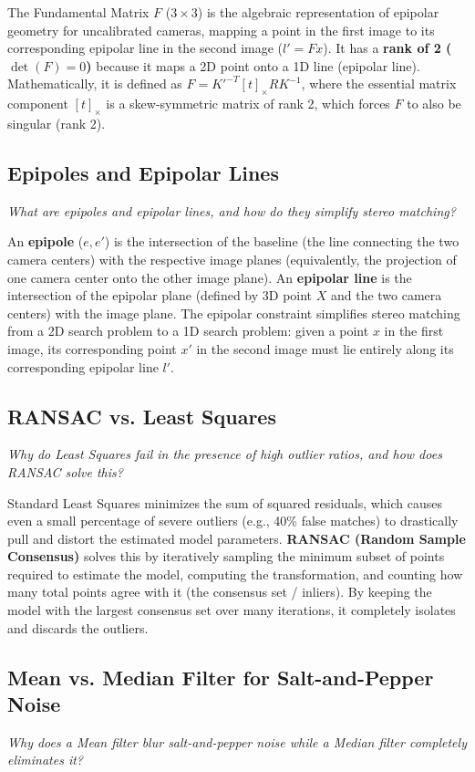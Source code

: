 The Fundamental Matrix $F$ ($3 \times 3$) is the algebraic representation of epipolar geometry for uncalibrated cameras, mapping a point in the first image to its corresponding epipolar line in the second image ($l' = Fx$).
It has a \textbf{rank of 2 ($\det(F) = 0$)} because it maps a 2D point onto a 1D line (epipolar line). Mathematically, it is defined as $F = K'^{-T} [t]_\times R K^{-1}$, where the essential matrix component $[t]_\times$ is a skew-symmetric matrix of rank 2, which forces $F$ to also be singular (rank 2).

\subsection{Epipoles and Epipolar Lines}
\textit{What are epipoles and epipolar lines, and how do they simplify stereo matching?}

An \textbf{epipole} ($e, e'$) is the intersection of the baseline (the line connecting the two camera centers) with the respective image planes (equivalently, the projection of one camera center onto the other image plane). An \textbf{epipolar line} is the intersection of the epipolar plane (defined by 3D point $X$ and the two camera centers) with the image plane.
The epipolar constraint simplifies stereo matching from a 2D search problem to a 1D search problem: given a point $x$ in the first image, its corresponding point $x'$ in the second image must lie entirely along its corresponding epipolar line $l'$.

\subsection{RANSAC vs. Least Squares}
\textit{Why do Least Squares fail in the presence of high outlier ratios, and how does RANSAC solve this?}

Standard Least Squares minimizes the sum of squared residuals, which causes even a small percentage of severe outliers (e.g., 40\% false matches) to drastically pull and distort the estimated model parameters.
\textbf{RANSAC (Random Sample Consensus)} solves this by iteratively sampling the minimum subset of points required to estimate the model, computing the transformation, and counting how many total points agree with it (the consensus set / inliers). By keeping the model with the largest consensus set over many iterations, it completely isolates and discards the outliers.

\subsection{Mean vs. Median Filter for Salt-and-Pepper Noise}
\textit{Why does a Mean filter blur salt-and-pepper noise while a Median filter completely eliminates it?}

